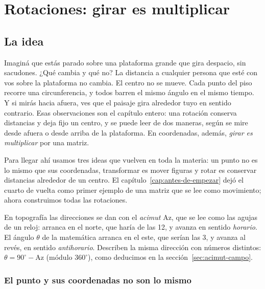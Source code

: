 \chapter{Rotaciones: girar es multiplicar}\label{cap:rotaciones}

\section{La idea}

Imaginá que estás parado sobre una plataforma grande que gira despacio, sin sacudones. ¿Qué
cambia y qué no? La distancia a cualquier persona que esté con vos sobre la plataforma no
cambia. El centro no se mueve. Cada punto del piso recorre una circunferencia, y todos barren
el mismo ángulo en el mismo tiempo. Y si mirás hacia afuera, ves que el paisaje gira alrededor
tuyo en sentido contrario. Esas observaciones son el capítulo entero: una rotación conserva
distancias y deja fijo un centro, y se puede leer de dos maneras, según se mire desde afuera o
desde arriba de la plataforma. En coordenadas, además, \emph{girar es multiplicar} por una
matriz.

Para llegar ahí usamos tres ideas que vuelven en toda la materia: un punto no es lo mismo que
sus coordenadas, transformar es mover figuras y rotar es conservar distancias alrededor de un
centro. El capítulo~\ref{cap:antes-de-empezar} dejó el cuarto de vuelta como primer ejemplo de
una matriz que se lee como movimiento; ahora construimos todas las rotaciones.

\begin{atencion}
En topografía las direcciones se dan con el \emph{acimut} \(\mathrm{Az}\), que se lee como las
agujas de un reloj: arranca en el norte, que haría de las 12, y avanza en sentido
\emph{horario}. El ángulo \(\theta\) de la matemática arranca en el este, que serían las 3, y
avanza al revés, en sentido \emph{antihorario}. Describen la misma dirección con números
distintos:
\(\theta=90^\circ-\mathrm{Az}\) (módulo \(360^\circ\)), como deducimos en la sección~\ref{sec:acimut-campo}.
\end{atencion}

\subsection{El punto y sus coordenadas no son lo mismo}\label{sec:punto-coordenadas}


